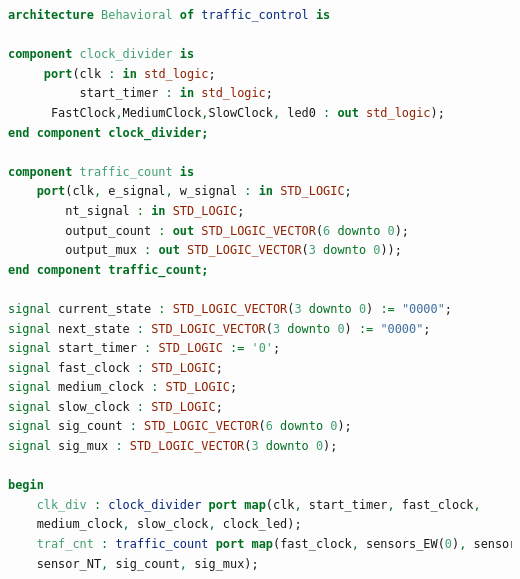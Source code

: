 \documentclass[11pt]{article}
\begin{document}
\begin{appendices}
\begin{lstlisting}[language=VHDL]
architecture Behavioral of traffic_control is

component clock_divider is
     port(clk : in std_logic;
          start_timer : in std_logic;
	  FastClock,MediumClock,SlowClock, led0 : out std_logic);
end component clock_divider;

component traffic_count is
    port(clk, e_signal, w_signal : in STD_LOGIC;
        nt_signal : in STD_LOGIC;
        output_count : out STD_LOGIC_VECTOR(6 downto 0);
        output_mux : out STD_LOGIC_VECTOR(3 downto 0));
end component traffic_count;

signal current_state : STD_LOGIC_VECTOR(3 downto 0) := "0000";
signal next_state : STD_LOGIC_VECTOR(3 downto 0) := "0000";
signal start_timer : STD_LOGIC := '0';
signal fast_clock : STD_LOGIC;
signal medium_clock : STD_LOGIC;
signal slow_clock : STD_LOGIC;
signal sig_count : STD_LOGIC_VECTOR(6 downto 0);
signal sig_mux : STD_LOGIC_VECTOR(3 downto 0);

begin
    clk_div : clock_divider port map(clk, start_timer, fast_clock, 
    medium_clock, slow_clock, clock_led);
    traf_cnt : traffic_count port map(fast_clock, sensors_EW(0), sensors_EW(1), 
    sensor_NT, sig_count, sig_mux);
    

\end{lstlisting}
\end{appendices}
\end{document}
